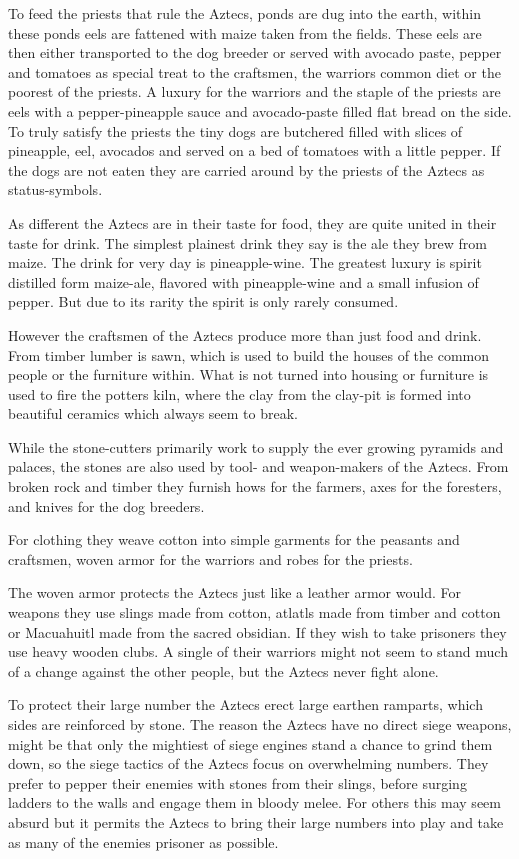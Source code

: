 To feed the priests that rule the \gls{Aztecs}, ponds are dug into the earth,
within these ponds eels are fattened with maize taken from the fields. These
eels are then either transported to the dog breeder or served with avocado
paste, pepper and tomatoes as special treat to the craftsmen, the warriors
common diet or the poorest of the priests. A luxury for the warriors and the
staple of the priests are eels with a pepper-pineapple sauce and avocado-paste
filled flat bread on the side. To truly satisfy the priests the tiny dogs are
butchered filled with slices of pineapple, eel, avocados and served on a bed of
tomatoes with a little pepper. If the dogs are not eaten they are carried
around by the priests of the \gls{Aztecs} as status-symbols.

As different the \gls{Aztecs} are in their taste for food, they are quite
united in their taste for drink. The simplest plainest drink they say is the
ale they brew from maize. The drink for very day is pineapple-wine. The
greatest luxury is spirit distilled form maize-ale, flavored with
pineapple-wine and a small infusion of pepper. But due to its rarity the spirit
is only rarely consumed.

However the craftsmen of the \gls{Aztecs} produce more than just food and
drink. From timber lumber is sawn, which is used to build the houses of the
common people or the furniture within. What is not turned into housing or
furniture is used to fire the potters kiln, where the clay from the clay-pit is
formed into beautiful ceramics which always seem to break.

While the stone-cutters primarily work to supply the ever growing pyramids and
palaces, the stones are also used by tool- and weapon-makers of the
\gls{Aztecs}. From broken rock and timber they furnish hows for the farmers,
axes for the foresters, and knives for the dog breeders.

For clothing they weave cotton into simple garments for the peasants and
craftsmen, woven armor for the warriors and robes for the priests.

The woven armor protects the \gls{Aztecs} just like a leather armor would. For
weapons they use slings made from cotton, atlatls made from timber and cotton
or Macuahuitl made from the sacred obsidian. If they wish to take prisoners
they use heavy wooden clubs. A single of their warriors might not seem to stand
much of a change against the other people, but the \gls{Aztecs} never fight
alone.

To protect their large number the \gls{Aztecs} erect large earthen ramparts,
which sides are reinforced by stone. The reason the \gls{Aztecs} have no direct
siege weapons, might be that only the mightiest of siege engines stand a chance
to grind them down, so the siege tactics of the \gls{Aztecs} focus on
overwhelming numbers. They prefer to pepper their enemies with stones from
their slings, before surging ladders to the walls and engage them in bloody
melee. For others this may seem absurd but it permits the \gls{Aztecs} to bring
their large numbers into play and take as many of the enemies prisoner as
possible.

